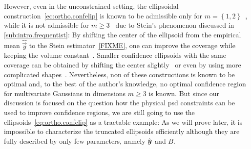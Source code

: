 However, even in the unconstrained setting, the ellipsoidal construction~\eqref{eq:ortho.confelip} is known to be admissible only for $m=\left\{ 1,2\right\}$~\cite{Joshi_1969_Admissibility}, while it is not admissible for $m\geq3$~\cite{Joshi_1967_Inadmissibility} due to Stein's phenomenon discussed in \cref{sub:intro.frequentist}:
By shifting the center of the ellipsoid from the empirical mean $\hat{\vec y}$ to the Stein estimator~\eqref{FIXME}, one can improve the coverage while keeping the volume constant~\cite{Joshi_1967_Inadmissibility}.
Smaller confidence ellipsoids with the same coverage can be obtained by shifting the center slightly~\cite{Tseng_1997_Good,Hwang_1982_Minimax} or even by using more complicated shapes~\cite{Shinozaki_????_Improved,Brown_1995_Optimal}.
Nevertheless, non of these constructions is known to be optimal and, to the best of the author's knowledge, no optimal confidence region for multivariate Gaussians in dimensions $m \ge 3$ is known.
But since our discussion is focused on the question how the physical psd constraints can be used to improve confidence regions, we are still going to use the ellipsoids~\eqref{eq:ortho.confelip} as a tractable example:
As we will prove later, it is impossible to characterize the truncated ellipsoids efficiently although they are fully described by only few parameters, namely $\hat{{\boldsymbol{y}}}$ and $B$.\\



